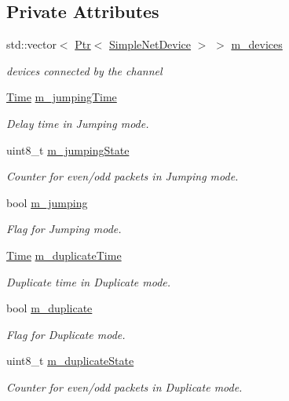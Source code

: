 \subsection*{Private Attributes}
\begin{DoxyCompactItemize}
\item 
std\+::vector$<$ \hyperlink{classns3_1_1Ptr}{Ptr}$<$ \hyperlink{classns3_1_1SimpleNetDevice}{Simple\+Net\+Device} $>$ $>$ \hyperlink{classns3_1_1ErrorChannel_a4e248f728c932f51306a33b2266b9111}{m\+\_\+devices}
\begin{DoxyCompactList}\small\item\em devices connected by the channel \end{DoxyCompactList}\item 
\hyperlink{classns3_1_1Time}{Time} \hyperlink{classns3_1_1ErrorChannel_adae2b3ed8ec9a910225e27ea6da2a651}{m\+\_\+jumping\+Time}
\begin{DoxyCompactList}\small\item\em Delay time in Jumping mode. \end{DoxyCompactList}\item 
uint8\+\_\+t \hyperlink{classns3_1_1ErrorChannel_ae90252b0fc0c7de52cf3fc738d5189e4}{m\+\_\+jumping\+State}
\begin{DoxyCompactList}\small\item\em Counter for even/odd packets in Jumping mode. \end{DoxyCompactList}\item 
bool \hyperlink{classns3_1_1ErrorChannel_a49f50334e8f921caa874ebdaeaab12e9}{m\+\_\+jumping}
\begin{DoxyCompactList}\small\item\em Flag for Jumping mode. \end{DoxyCompactList}\item 
\hyperlink{classns3_1_1Time}{Time} \hyperlink{classns3_1_1ErrorChannel_a0130efccfb3dc20545847d7b75a3c808}{m\+\_\+duplicate\+Time}
\begin{DoxyCompactList}\small\item\em Duplicate time in Duplicate mode. \end{DoxyCompactList}\item 
bool \hyperlink{classns3_1_1ErrorChannel_aea4a0d1603a9af1355a1a24ee451bd3d}{m\+\_\+duplicate}
\begin{DoxyCompactList}\small\item\em Flag for Duplicate mode. \end{DoxyCompactList}\item 
uint8\+\_\+t \hyperlink{classns3_1_1ErrorChannel_a118fbf4ec58f791b2bc10796594a1999}{m\+\_\+duplicate\+State}
\begin{DoxyCompactList}\small\item\em Counter for even/odd packets in Duplicate mode. \end{DoxyCompactList}\end{DoxyCompactItemize}
